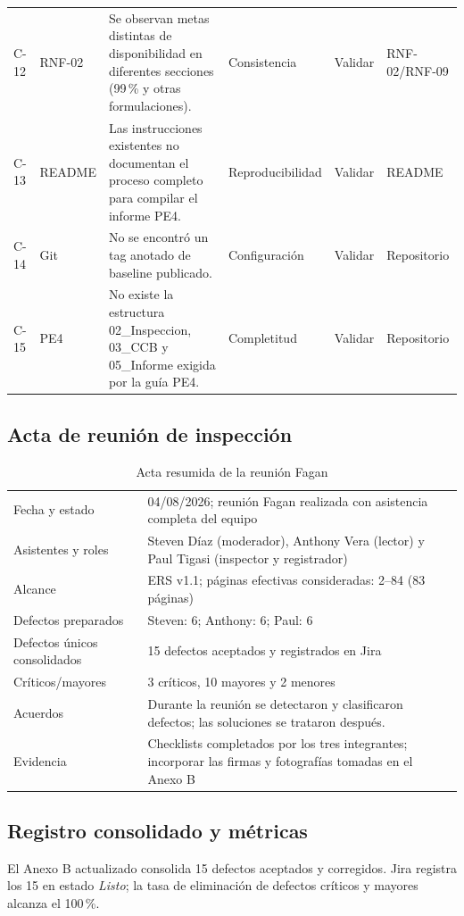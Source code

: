 \documentclass[11pt,a4paper]{article}
\begin{document}
\begin{longtable}{p{0.8cm}p{2.0cm}p{4.5cm}p{2.1cm}p{1.6cm}p{2.3cm}}
		C-12 & RNF-02 & Se observan metas distintas de disponibilidad en diferentes secciones (99\,\% y otras formulaciones). & Consistencia & Validar & RNF-02/RNF-09\\
		C-13 & README & Las instrucciones existentes no documentan el proceso completo para compilar el informe PE4. & Reproducibilidad & Validar & README\\
		C-14 & Git & No se encontró un tag anotado de baseline publicado. & Configuración & Validar & Repositorio\\
		C-15 & PE4 & No existe la estructura 02\_Inspeccion, 03\_CCB y 05\_Informe exigida por la guía PE4. & Completitud & Validar & Repositorio\\
		\bottomrule
	\end{longtable}
	
	\subsection{Acta de reunión de inspección}
	\begin{table}[H]
		\centering
		\caption{Acta resumida de la reunión Fagan}
		\begin{tabularx}{\textwidth}{p{4.1cm}X}
			\toprule
			Fecha y estado & 04/08/2026; reunión Fagan realizada con asistencia completa del equipo\\
			Asistentes y roles & Steven Díaz (moderador), Anthony Vera (lector) y Paul Tigasi (inspector y registrador)\\
			Alcance & ERS v1.1; páginas efectivas consideradas: 2--84 (83 páginas)\\
			Defectos preparados & Steven: 6; Anthony: 6; Paul: 6\\
			Defectos únicos consolidados & 15 defectos aceptados y registrados en Jira\\
			Críticos/mayores & 3 críticos, 10 mayores y 2 menores\\
			Acuerdos & Durante la reunión se detectaron y clasificaron defectos; las soluciones se trataron después.\\
			Evidencia & Checklists completados por los tres integrantes; incorporar las firmas y fotografías tomadas en el Anexo B\\
			\bottomrule
		\end{tabularx}
	\end{table}
	
	\subsection{Registro consolidado y métricas}
	El Anexo B actualizado consolida 15 defectos aceptados y corregidos. Jira registra los 15 en estado \textit{Listo}; la tasa de eliminación de defectos críticos y mayores alcanza el 100\,\%.
	
\end{document}
